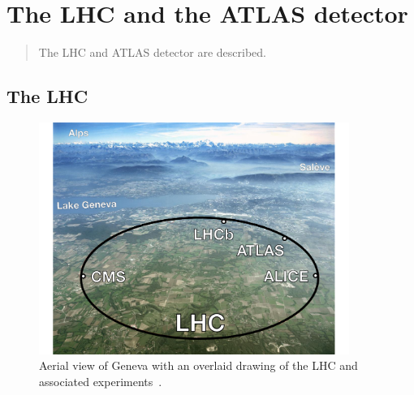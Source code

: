 \chapter[The LHC and the ATLAS detector][The LHC and the ATLAS detector]{The LHC and the ATLAS detector}
\label{chap:lhcatlas}

\begin{quote}
  The LHC and ATLAS detector are described.
\end{quote}
 
\section{The LHC}
\label{sec:lhc}

\begin{figure}[tp]
  \centering
  \includegraphics[width=0.90\textwidth]{figures/lhc-atlas/lhc-switzerland}
  \caption{Aerial view of Geneva with an overlaid drawing of the LHC and associated experiments~\cite{atlas-surface}.}
  \label{fig:lhc-switzerland}
\end{figure}

